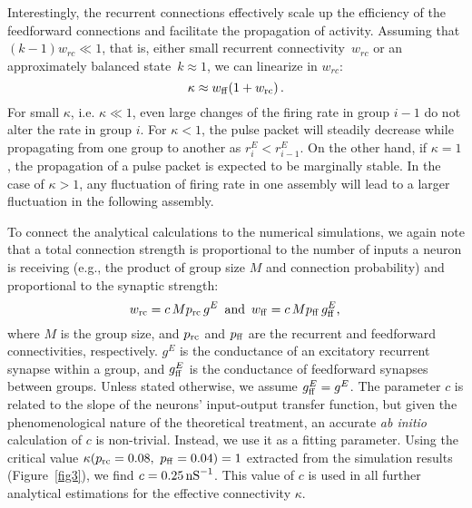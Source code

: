     Interestingly, the recurrent connections effectively scale up the
    efficiency of the feedforward connections and facilitate the propagation of
    activity. Assuming that $(k-1) w_{rc}\ll1$, that is, either small
    recurrent connectivity~$w_{rc}$ or an approximately balanced
    state~$k\approx 1$, we can linearize in $w_{rc}$:
    \begin{equation}
      \kappa \approx w_{\rm ff}(1+w_{\rm rc}) \,.
      \label{eq:kappa_def}
    \end{equation}
    For small $\kappa$, i.e. $\kappa \ll 1$, even large changes of the firing
    rate in group $i-1$ do not alter the rate in group $i$. For $\kappa<1$, the
    pulse packet will steadily decrease while propagating from one group to
    another as $r_i^E < r_{i-1}^E$. On the other hand, if $\kappa=1$, the
    propagation of a pulse packet is expected to be marginally stable. In the
    case of $\kappa > 1$, any fluctuation of firing rate in one assembly will
    lead to a larger fluctuation in the following assembly.
      
    To connect the analytical calculations to the numerical simulations, we
    again note that a total connection strength is proportional to the number
    of inputs a neuron is receiving (e.g., the product of group size $M$ and
    connection probability) and proportional to the synaptic strength:
    \begin{equation}
      w_{\rm rc} = c \, M p_{\rm rc} \, g^E \,\text{      and      } \, w_{ \rm ff} = c \, M p_{\rm ff} \, g_{\rm ff}^{E} ,\,
      \label{eq:weights_linear}
    \end{equation}
    where $M$ is the group size, and $p_{\rm rc}$ and $p_{\rm ff}$ are the
    recurrent and feedforward connectivities, respectively. $g^E$ is the
    conductance of an excitatory recurrent synapse within a group, and $g_{\rm
    ff}^E$ is the conductance of feedforward synapses between groups. Unless
    stated otherwise, we assume $g_{\rm ff}^E=g^E$. The parameter $c$ is
    related to the slope of the neurons' input-output transfer function, but
    given the phenomenological nature of the theoretical treatment, an accurate
    \emph{ab initio} calculation of $c$ is non-trivial. Instead, we use it as a
    fitting parameter. Using the critical value $\kappa(p_{\rm rc}=0.08,~p_{\rm
    ff}=0.04)=1$ extracted from the simulation results (Figure~\ref{fig3}), we
    find $c = 0.25 \, {\rm nS}^{-1}$. This value of $c$ is used in all further
    analytical estimations for the effective connectivity $\kappa$. 
    
